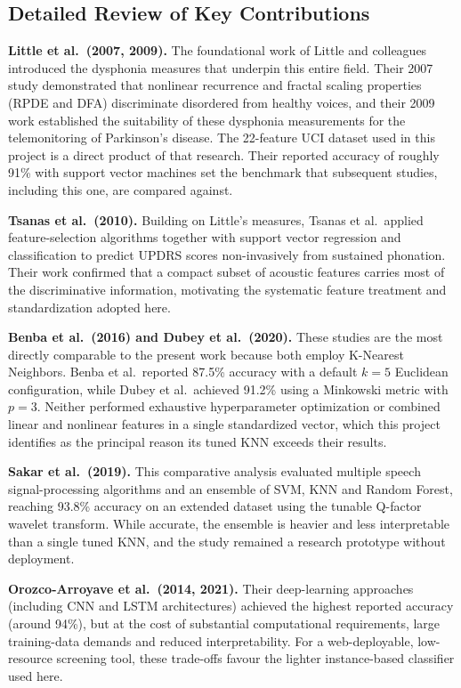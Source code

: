 \documentclass[oneside,a4paper,12pt]{report}
\begin{document}
\subsection{Detailed Review of Key Contributions}
\textbf{Little et al.\ (2007, 2009).} The foundational work of Little and
colleagues introduced the dysphonia measures that underpin this entire field.
Their 2007 study demonstrated that nonlinear recurrence and fractal scaling
properties (RPDE and DFA) discriminate disordered from healthy voices, and their
2009 work established the suitability of these dysphonia measurements for the
telemonitoring of Parkinson's disease. The 22-feature UCI dataset used in this
project is a direct product of that research. Their reported accuracy of roughly
91\% with support vector machines set the benchmark that subsequent studies,
including this one, are compared against.

\textbf{Tsanas et al.\ (2010).} Building on Little's measures, Tsanas et al.\
applied feature-selection algorithms together with support vector regression and
classification to predict UPDRS scores non-invasively from sustained phonation.
Their work confirmed that a compact subset of acoustic features carries most of
the discriminative information, motivating the systematic feature treatment and
standardization adopted here.

\textbf{Benba et al.\ (2016) and Dubey et al.\ (2020).} These studies are the most
directly comparable to the present work because both employ K-Nearest Neighbors.
Benba et al.\ reported 87.5\% accuracy with a default $k=5$ Euclidean
configuration, while Dubey et al.\ achieved 91.2\% using a Minkowski metric with
$p=3$. Neither performed exhaustive hyperparameter optimization or combined linear
and nonlinear features in a single standardized vector, which this project
identifies as the principal reason its tuned KNN exceeds their results.

\textbf{Sakar et al.\ (2019).} This comparative analysis evaluated multiple speech
signal-processing algorithms and an ensemble of SVM, KNN and Random Forest,
reaching 93.8\% accuracy on an extended dataset using the tunable Q-factor wavelet
transform. While accurate, the ensemble is heavier and less interpretable than a
single tuned KNN, and the study remained a research prototype without deployment.

\textbf{Orozco-Arroyave et al.\ (2014, 2021).} Their deep-learning approaches
(including CNN and LSTM architectures) achieved the highest reported accuracy
(around 94\%), but at the cost of substantial computational requirements, large
training-data demands and reduced interpretability. For a web-deployable,
low-resource screening tool, these trade-offs favour the lighter instance-based
classifier used here.
\end{document}
